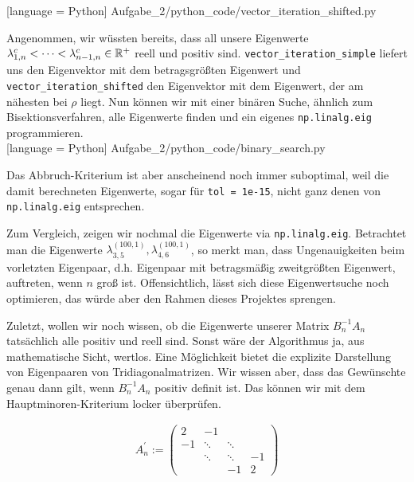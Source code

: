 
[language = Python]
{Aufgabe_2/python_code/vector_iteration_shifted.py}
\vspace{10pt}

Angenommen, wir wüssten bereits, dass all unsere Eigenwerte $\lambda_{1, n}^c < \cdots < \lambda_{n-1, n}^c \in \mathbb{R}^+$ reell und positiv sind. \verb|vector_iteration_simple| liefert uns den Eigenvektor mit dem betragsgrößten Eigenwert und \verb|vector_iteration_shifted| den Eigenvektor mit dem Eigenwert, der am nähesten bei $\rho$ liegt. Nun können wir mit einer binären Suche, ähnlich zum Bisektionsverfahren, alle Eigenwerte finden und ein eigenes \verb|np.linalg.eig| programmieren. \\


[language = Python]
{Aufgabe_2/python_code/binary_search.py}
\vspace{10pt}

Das Abbruch-Kriterium ist aber anscheinend noch immer suboptimal, weil die damit berechneten Eigenwerte, sogar für \verb|tol = 1e-15|, nicht ganz denen von \verb|np.linalg.eig| entsprechen. \\


\vspace{10pt}

Zum Vergleich, zeigen wir nochmal die Eigenwerte via \verb|np.linalg.eig|. Betrachtet man die Eigenwerte $\lambda_{3, 5}^{(100, 1)}, \lambda_{4, 6}^{(100, 1)}$, so merkt man, dass Ungenauigkeiten beim vorletzten Eigenpaar, d.h. Eigenpaar mit betragsmäßig zweitgrößten Eigenwert, auftreten, wenn $n$ groß ist. Offensichtlich, lässt sich diese Eigenwertsuche noch optimieren, das würde aber den Rahmen dieses Projektes sprengen. \\


\vspace{10pt}

Zuletzt, wollen wir noch wissen, ob die Eigenwerte unserer Matrix $B_n^{-1} A_n$ tatsächlich alle positiv und reell sind. Sonst wäre der Algorithmus ja, aus mathematische Sicht, wertlos. Eine Möglichkeit bietet die explizite Darstellung von Eigenpaaren von Tridiagonalmatrizen. Wir wissen aber, dass das Gewünschte genau dann gilt, wenn $B_n^{-1} A_n$ positiv definit ist. Das können wir mit dem Hauptminoren-Kriterium locker überprüfen.

\begin{align*}
  A_n^\prime :=
  \begin{pmatrix}
     2 &  -1     &        &    \\
    -1 &  \ddots & \ddots &    \\
       &  \ddots & \ddots & -1 \\
       &         & -1     &  2
  \end{pmatrix}
\end{align*}

